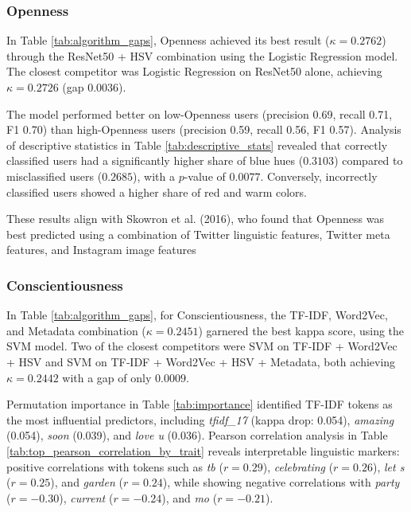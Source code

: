 \subsubsection{Openness}

In Table \ref{tab:algorithm_gaps}, Openness achieved its best result ($\kappa = 0.2762$) through the ResNet50 + HSV combination using the Logistic Regression model. The closest competitor was Logistic Regression on ResNet50 alone, achieving $\kappa = 0.2726$ (gap $0.0036$).


The model performed better on low-Openness users (precision 0.69, recall 0.71, F1 0.70) than high-Openness users (precision 0.59, recall 0.56, F1 0.57). Analysis of descriptive statistics in Table \ref{tab:descriptive_stats} revealed that correctly classified users had a significantly 
higher share of blue hues ($0.3103$) compared to misclassified users ($0.2685$), with a 
$p$-value of $0.0077$. Conversely, incorrectly classified users showed a higher share of red 
and warm colors. 

These results align with Skowron et al. (2016), who found that Openness was best predicted using a combination of Twitter linguistic features, Twitter meta features, and Instagram image features %


\subsubsection{Conscientiousness}

In Table \ref{tab:algorithm_gaps}, for Conscientiousness, the TF-IDF, Word2Vec, and Metadata combination ($\kappa = 0.2451$) garnered the best kappa score, using the SVM model. Two of the closest competitors were SVM on TF‑IDF + Word2Vec + HSV and SVM on TF‑IDF + Word2Vec + HSV + Metadata, both achieving $\kappa = 0.2442$ with a gap of only $0.0009$.

Permutation importance in Table \ref{tab:importance} identified TF-IDF tokens as the most influential predictors, including \textit{tfidf\_17} (kappa drop: 0.054), \textit{amazing} (0.054), \textit{soon} (0.039), and \textit{love u} (0.036). Pearson correlation analysis in Table \ref{tab:top_pearson_correlation_by_trait} reveals interpretable linguistic markers: positive correlations with tokens such as \textit{tb} ($r = 0.29$), \textit{celebrating} ($r = 0.26$), \textit{let s} ($r = 0.25$), and \textit{garden} ($r = 0.24$), while showing negative correlations with \textit{party} ($r = -0.30$), \textit{current} ($r = -0.24$), and \textit{mo} ($r = -0.21$).

